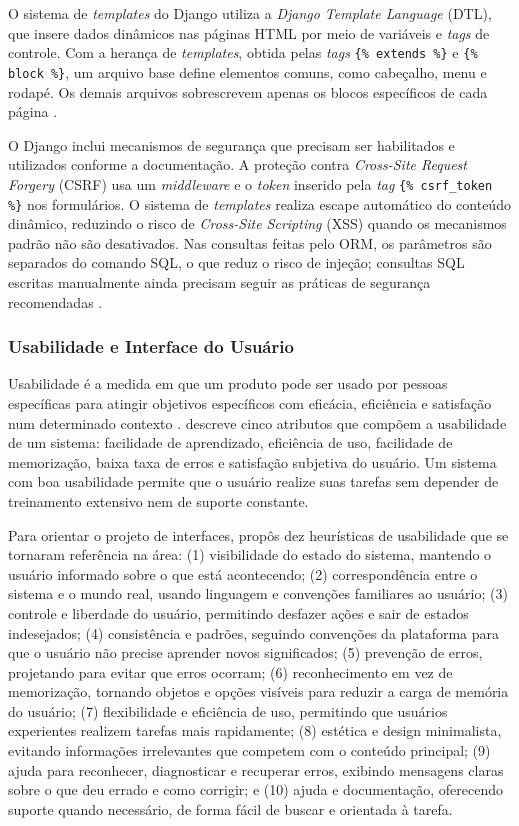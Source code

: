 \documentclass[
	12pt,				%
	twoside,			%
	openany,			%
	a4paper,			%
	chapter=TITLE,		%
	section=TITLE,		%
	subsection=TITLE,	%
	subsubsection=TITLE,%
	english,			%
	french,				%
	spanish,			%
	brazil,				%
	]{abntex2}
\begin{document}
O sistema de \textit{templates} do Django utiliza a \textit{Django Template Language} (DTL), que insere dados dinâmicos nas páginas HTML por meio de variáveis e \textit{tags} de controle. Com a herança de \textit{templates}, obtida pelas \textit{tags} \texttt{\{\% extends \%\}} e \texttt{\{\% block \%\}}, um arquivo base define elementos comuns, como cabeçalho, menu e rodapé. Os demais arquivos sobrescrevem apenas os blocos específicos de cada página \cite{djangodocs}.

O Django inclui mecanismos de segurança que precisam ser habilitados e utilizados conforme a documentação. A proteção contra \textit{Cross-Site Request Forgery} (CSRF) usa um \textit{middleware} e o \textit{token} inserido pela \textit{tag} \texttt{\{\% csrf\_token \%\}} nos formulários. O sistema de \textit{templates} realiza escape automático do conteúdo dinâmico, reduzindo o risco de \textit{Cross-Site Scripting} (XSS) quando os mecanismos padrão não são desativados. Nas consultas feitas pelo ORM, os parâmetros são separados do comando SQL, o que reduz o risco de injeção; consultas SQL escritas manualmente ainda precisam seguir as práticas de segurança recomendadas \cite{djangodocs}.

\subsubsection{Usabilidade e Interface do Usuário}
\label{sec:usab}

Usabilidade é a medida em que um produto pode ser usado por pessoas específicas para atingir objetivos específicos com eficácia, eficiência e satisfação num determinado contexto \cite{nielsen1993}.  descreve cinco atributos que compõem a usabilidade de um sistema: facilidade de aprendizado, eficiência de uso, facilidade de memorização, baixa taxa de erros e satisfação subjetiva do usuário. Um sistema com boa usabilidade permite que o usuário realize suas tarefas sem depender de treinamento extensivo nem de suporte constante.

Para orientar o projeto de interfaces,  propôs dez heurísticas de usabilidade que se tornaram referência na área: (1) visibilidade do estado do sistema, mantendo o usuário informado sobre o que está acontecendo; (2) correspondência entre o sistema e o mundo real, usando linguagem e convenções familiares ao usuário; (3) controle e liberdade do usuário, permitindo desfazer ações e sair de estados indesejados; (4) consistência e padrões, seguindo convenções da plataforma para que o usuário não precise aprender novos significados; (5) prevenção de erros, projetando para evitar que erros ocorram; (6) reconhecimento em vez de memorização, tornando objetos e opções visíveis para reduzir a carga de memória do usuário; (7) flexibilidade e eficiência de uso, permitindo que usuários experientes realizem tarefas mais rapidamente; (8) estética e design minimalista, evitando informações irrelevantes que competem com o conteúdo principal; (9) ajuda para reconhecer, diagnosticar e recuperar erros, exibindo mensagens claras sobre o que deu errado e como corrigir; e (10) ajuda e documentação, oferecendo suporte quando necessário, de forma fácil de buscar e orientada à tarefa.
\end{document}
